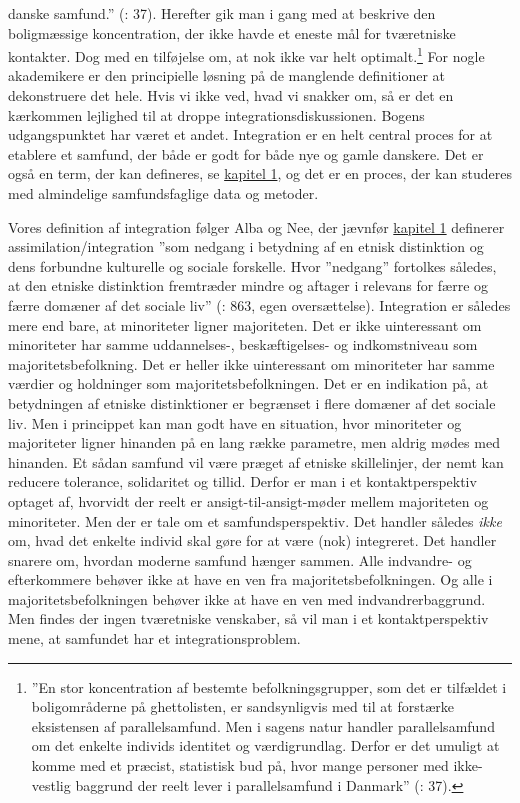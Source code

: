 \documentclass[
]{book}
\begin{document}
danske samfund.'' (: 37). Herefter gik man i gang med at beskrive den boligmæssige koncentration, der ikke havde et eneste mål for tværetniske kontakter. Dog med en tilføjelse om, at nok ikke var helt optimalt.\footnote{''En stor koncentration af bestemte befolkningsgrupper, som det er tilfældet i boligområderne på ghettolisten, er sandsynligvis med til at forstærke eksistensen af parallelsamfund. Men i sagens natur handler parallelsamfund om det enkelte individs identitet og værdigrundlag. Derfor er det umuligt at komme med et præcist, statistisk bud på, hvor mange personer med ikke-vestlig baggrund der reelt lever i parallelsamfund i Danmark'' (: 37).} For nogle akademikere er den principielle løsning på de manglende definitioner at dekonstruere det hele. Hvis vi ikke ved, hvad vi snakker om, så er det en kærkommen lejlighed til at droppe integrationsdiskussionen. Bogens udgangspunktet har været et andet. Integration er en helt central proces for at etablere et samfund, der både er godt for både nye og gamle danskere. Det er også en term, der kan defineres, se \hyperref[kap1]{kapitel 1}, og det er en proces, der kan studeres med almindelige samfundsfaglige data og metoder.

Vores definition af integration følger Alba og Nee, der jævnfør \hyperref[kap1]{kapitel 1} definerer assimilation/integration ''som nedgang i betydning af en etnisk distinktion og dens forbundne kulturelle og sociale forskelle. Hvor ''nedgang'' fortolkes således, at den etniske distinktion fremtræder mindre og aftager i relevans for færre og færre domæner af det sociale liv'' (: 863, egen oversættelse). Integration er således mere end bare, at minoriteter ligner majoriteten. Det er ikke uinteressant om minoriteter har samme uddannelses-, beskæftigelses- og indkomstniveau som majoritetsbefolkning. Det er heller ikke uinteressant om minoriteter har samme værdier og holdninger som majoritetsbefolkningen. Det er en indikation på, at betydningen af etniske distinktioner er begrænset i flere domæner af det sociale liv. Men i princippet kan man godt have en situation, hvor minoriteter og majoriteter ligner hinanden på en lang række parametre, men aldrig mødes med hinanden. Et sådan samfund vil være præget af etniske skillelinjer, der nemt kan reducere tolerance, solidaritet og tillid. Derfor er man i et kontaktperspektiv optaget af, hvorvidt der reelt er ansigt-til-ansigt-møder mellem majoriteten og minoriteter. Men der er tale om et samfundsperspektiv. Det handler således \emph{ikke} om, hvad det enkelte individ skal gøre for at være (nok) integreret. Det handler snarere om, hvordan moderne samfund hænger sammen. Alle indvandre- og efterkommere behøver ikke at have en ven fra majoritetsbefolkningen. Og alle i majoritetsbefolkningen behøver ikke at have en ven med indvandrerbaggrund. Men findes der ingen tværetniske venskaber, så vil man i et kontaktperspektiv mene, at samfundet har et integrationsproblem.
\end{document}
